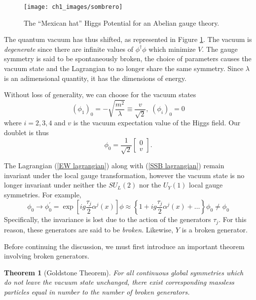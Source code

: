 \documentclass[10pt,a4paper]{book}
\newtheorem*{theorem*}{Theorem}
\begin{document}
\begin{figure}
\centering
\texttt{[image: ch1\_images/sombrero]}
\caption{The ``Mexican hat'' Higgs Potential for an Abelian gauge theory.}
\label{Higgs Potential}
\end{figure}
The quantum vacuum has thus shifted, as represented in Figure \ref{Higgs Potential}. The vacuum is \emph{degenerate} since there are infinite values of $\phi^\dagger\phi$ which minimize $V$. The gauge symmetry is said to be spontaneously broken, the choice of parameters causes the vacuum state and the Lagrangian to no longer share the same symmetry. Since $\lambda$ is an adimensional quantity, it has the dimensions of energy.

Without loss of generality, we can choose for the vacuum states
\begin{equation}
(\phi_1)_0 = -\sqrt{\frac{m^2}{\lambda}} \equiv \frac{v}{\sqrt{2}}, \; (\phi_i)_0 = 0
\end{equation}
where $i = 2,3,4$ and $v$ is the vacuum expectation value of the Higgs field.
Our doublet is thus
\begin{equation}
\phi_0 = \frac{1}{\sqrt{2}}\begin{bmatrix}
0 \\
v
\end{bmatrix}.
\end{equation}

The Lagrangian (\ref{EW lagrangian}) along with (\ref{SSB lagrangian}) remain invariant under the local gauge transformation, however the vacuum state is no longer invariant under neither the $SU_L(2)$ nor the $U_Y(1)$ local gauge symmetries. For example, 
\begin{equation}
\phi_0 \rightarrow \phi_0^\prime = \exp\left[ig \frac{\tau_j}{2}\alpha^j(x)\right]\phi \approx \left\lbrace 1  + ig\frac{\tau_j}{2}\alpha^j(x) + \dots \right\rbrace\phi_0 \neq \phi_0
\end{equation}
Specifically, the invariance is lost due to the action of the generators $\tau_j$. For this reason, these generators are said to be \emph{broken}. Likewise, $Y$ is a broken generator.

Before continuing the discussion, we must first introduce an important theorem involving broken generators.

\begin{theorem*}[Goldstone Theorem]
\label{Goldstone Theorem}
For all continuous global symmetries which do not leave the vacuum state unchanged, there exist corresponding massless particles equal in number to the number of broken generators.
\end{theorem*}
\end{document}
